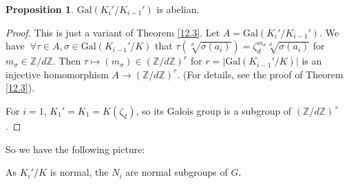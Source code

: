 \documentclass{article}
\theoremstyle{definition}
\newtheorem{prop}[theorem]{Proposition}
\begin{document}
\begin{prop}
    $\text{Gal}(K_i'/K_{i-1}')$ is abelian.
\end{prop}
\begin{proof}
    This is just a variant of Theorem \ref{12.3}. Let $A=\text{Gal}(K_i'/K_{i-1}')$. We have $~\forall \tau \in A, \sigma \in \text{Gal}(K_{i-1}'/K)$ that $\tau\left(\sqrt[d]{\sigma(a_i)}\right)=\zeta_d^{m_{\sigma}}\sqrt[d]{\sigma(a_i)}$ for $m_\sigma \in \mathbb{Z}/d\mathbb{Z}$. Then $\tau \mapsto (m_\sigma)\in (\mathbb{Z}/d\mathbb{Z})^r$ for $r = |\text{Gal}(K_{i-1}'/K)|$ is an injective homomorphism $A \to (\mathbb{Z}/d\mathbb{Z})^r$. (For details, see the proof of Theorem \ref{12.3}).
    \vspace{1mm}
    
    For $i=1$, $K_1'=K_1=K(\zeta_d)$, so its Galois group is a subgroup of $(\mathbb{Z}/d\mathbb{Z})^\times$.
\end{proof}
So we have the following picture:
\begin{figure}[H]
    \centering
\end{figure}
As $K_i'/K$ is normal, the $N_i$ are normal subgroups of $G$.
\end{document}
